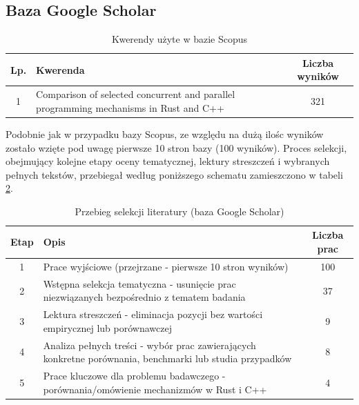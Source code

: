 \subsection{Baza Google Scholar}
\begin{table}[H]
    \caption{Kwerendy użyte w bazie Scopus \protect \footnotemark}
    \label{table:literatureReviewQueries}
    \begin{tabular}{cp{11cm}c}
    \hline
    Lp. & Kwerenda & Liczba wyników \\ \hline
    1 & Comparison of selected concurrent and parallel programming mechanisms in Rust and C++ & 321 \\ \hline

    \end{tabular}
\end{table}
Podobnie jak w przypadku bazy Scopus, ze względu na dużą ilośc wyników zostało wzięte pod uwagę pierwsze 10 stron bazy (100 wyników). Proces selekcji, obejmujący kolejne etapy oceny tematycznej, lektury streszczeń i wybranych pełnych tekstów, przebiegał według poniższego schematu zamieszczono w tabeli \ref{table:selectionProcessGoogle}.
\begin{table}[H]
    \caption{Przebieg selekcji literatury (baza Google Scholar)} 
    \label{table:selectionProcessGoogle}
    \begin{tabular}{cp{11.5cm}c}
    \hline
    Etap & Opis & Liczba prac  \\ \hline 
    1 & Prace wyjściowe (przejrzane - pierwsze 10 stron wyników) & 100 \\ \hline 
    2 & Wstępna selekcja tematyczna - usunięcie prac niezwiązanych bezpośrednio z tematem badania & 37 \\ \hline 
    3 & Lektura streszczeń - eliminacja pozycji bez wartości empirycznej lub porównawczej & 9 \\ \hline 
    4 & Analiza pełnych treści - wybór prac zawierających konkretne porównania, benchmarki lub studia przypadków & 8 \\ \hline 
    5 & Prace kluczowe dla problemu badawczego - porównania/omówienie mechanizmów w Rust i C++ & 4 \\ \hline 
    \end{tabular} 
\end{table}


